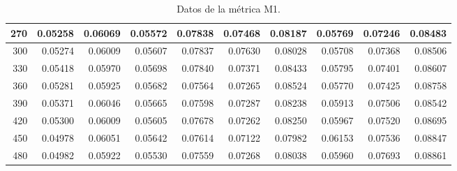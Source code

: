 \begin{table}[h]
\begin{tabular}{|r|r|r|r|r|r|r|r|r|r|}
        \hline \tiny 270 &{\tiny 0.05258}&{\tiny 0.06069}&{\tiny 0.05572}&{\tiny 0.07838}&{\tiny
        0.07468}&{\tiny 0.08187}&{\tiny 0.05769}&{\tiny 0.07246} &{\tiny 0.08483} \\
        \hline \tiny 300 &{\tiny 0.05274}&{ \tiny 0.06009}&{\tiny 0.05607}&{\tiny 0.07837}&{\tiny
        0.07630}&{\tiny 0.08028}&{\tiny 0.05708}&{\tiny 0.07368} &{\tiny 0.08506} \\
        \hline \tiny 330 &{\tiny 0.05418}&{\tiny 0.05970}&{\tiny 0.05698}&{\tiny 0.07840}&{\tiny
        0.07371}&{\tiny 0.08433}&{\tiny 0.05795}&{\tiny 0.07401} &{\tiny 0.08607} \\
        \hline \tiny 360 &{\tiny 0.05281}&{\tiny 0.05925}&{\tiny 0.05682}&{\tiny 0.07564}&{\tiny
        0.07265}&{\tiny 0.08524}&{\tiny 0.05770}&{\tiny 0.07425} &{\tiny 0.08758} \\
        \hline \tiny 390 &{\tiny 0.05371}&{\tiny 0.06046}&{\tiny 0.05665}&{\tiny 0.07598}&{\tiny
        0.07287}&{\tiny 0.08238}&{\tiny 0.05913}&{\tiny 0.07506} &{\tiny 0.08542} \\
        \hline \tiny 420 &{\tiny 0.05300}&{\tiny 0.06009}&{\tiny 0.05605}&{\tiny 0.07678}&{\tiny
        0.07262}&{\tiny 0.08250}&{\tiny 0.05967}&{\tiny 0.07520} &{\tiny 0.08695} \\
        \hline \tiny 450 &{\tiny 0.04978}&{\tiny 0.06051}&{\tiny 0.05642}&{\tiny 0.07614}&{\tiny
        0.07122}&{\tiny 0.07982}&{\tiny 0.06153}&{\tiny 0.07536} &{\tiny 0.08847} \\
        \hline \tiny 480 &{\tiny 0.04982}&{\tiny 0.05922}&{\tiny 0.05530}&{\tiny 0.07559}&{\tiny
        0.07268}&{\tiny 0.08038}&{\tiny 0.05960}&{\tiny 0.07693} &{\tiny 0.08861} \\
        \hline
    \end{tabular}
    \caption{Datos de la m\'etrica M1.}
    \label{tabA1}
\end{table}

